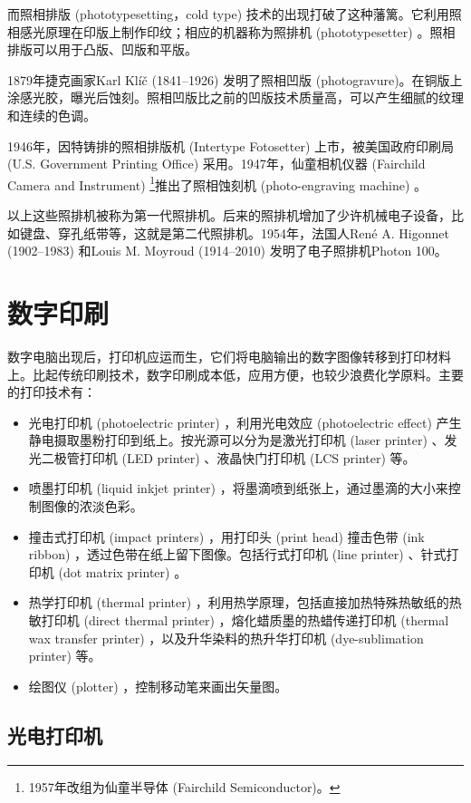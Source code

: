 而照相排版 (phototypesetting，cold type) 技术的出现打破了这种藩篱。它利用照相感光原理在印版上制作印纹；相应的机器称为照排机 (phototypesetter) 。照相排版可以用于凸版、凹版和平版。

1879年捷克画家Karl Klíč (1841--1926)\indexKlic{} 发明了照相凹版 (photogravure)。在铜版上涂感光胶，曝光后蚀刻。照相凹版比之前的凹版技术质量高，可以产生细腻的纹理和连续的色调。

1946年，因特铸排的照相排版机 (Intertype Fotosetter) 上市，被美国政府印刷局 (U.S. Government Printing Office) 采用。1947年，仙童相机仪器 (Fairchild Camera and Instrument)\indexFairchild{} \footnote{1957年改组为仙童半导体 (Fairchild Semiconductor)。}推出了照相蚀刻机 (photo-engraving machine) 。

以上这些照排机被称为第一代照排机。后来的照排机增加了少许机械电子设备，比如键盘、穿孔纸带等，这就是第二代照排机。1954年，法国人René A. Higonnet (1902--1983)\indexHigonnet{} 和Louis M. Moyroud (1914--2010)\indexMoyroud{} 发明了电子照排机Photon 100。

\section{数字印刷}
数字电脑出现后，打印机应运而生，它们将电脑输出的数字图像转移到打印材料上。比起传统印刷技术，数字印刷成本低，应用方便，也较少浪费化学原料。主要的打印技术有：

\begin{itemize}
    \item 光电打印机 (photoelectric printer) ，利用光电效应 (photoelectric effect) 产生静电摄取墨粉打印到纸上。按光源可以分为是激光打印机 (laser printer) 、发光二极管打印机 (LED printer) 、液晶快门打印机 (LCS printer) 等。
    \item 喷墨打印机 (liquid inkjet printer) ，将墨滴喷到纸张上，通过墨滴的大小来控制图像的浓淡色彩。
    \item 撞击式打印机 (impact printers) ，用打印头 (print head) 撞击色带 (ink ribbon) ，透过色带在纸上留下图像。包括行式打印机 (line printer) 、针式打印机 (dot matrix printer) 。
    \item 热学打印机 (thermal printer) ，利用热学原理，包括直接加热特殊热敏纸的热敏打印机 (direct thermal printer) ，熔化蜡质墨的热蜡传递打印机 (thermal wax transfer printer) ，以及升华染料的热升华打印机 (dye-sublimation printer) 等。
    \item 绘图仪 (plotter) ，控制移动笔来画出矢量图。
\end{itemize}

\subsection{光电打印机}

